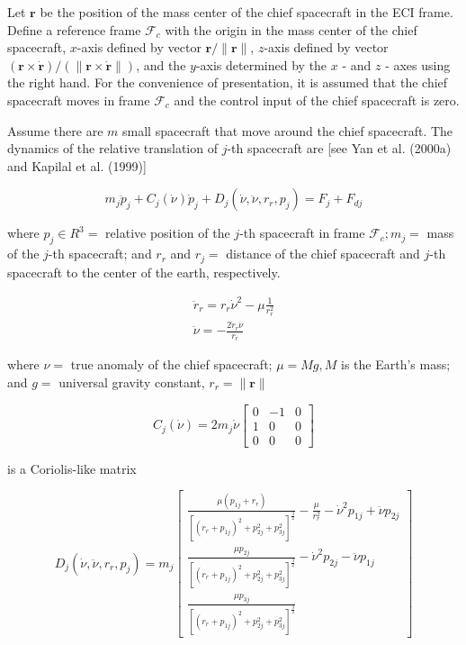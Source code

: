 \documentclass[10pt]{article}
\begin{document}
Let $\mathbf{r}$ be the position of the mass center of the chief spacecraft in the ECI frame. Define a reference frame $\mathcal{F}_{c}$ with the origin in the mass center of the chief spacecraft, $x$-axis defined by vector $\mathbf{r} /\|\mathbf{r}\|$, $z$-axis defined by vector $(\mathbf{r} \times \dot{\mathbf{r}}) /(\|\mathbf{r} \times \dot{\mathbf{r}}\|)$, and the $y$-axis determined by the $x$ - and $z$ - axes using the right hand. For the convenience of presentation, it is assumed that the chief spacecraft moves in frame $\mathcal{F}_{c}$ and the control input of the chief spacecraft is zero.

Assume there are $m$ small spacecraft that move around the chief spacecraft. The dynamics of the relative translation of $j$-th spacecraft are [see Yan et al. (2000a) and Kapilal et al. (1999)]

$$
m_{j} \ddot{p}_{j}+C_{j}(\dot{\nu}) \dot{p}_{j}+D_{j}\left(\dot{\nu}, \ddot{\nu}, r_{r}, p_{j}\right)=F_{j}+F_{d j}
$$

where $p_{j} \in R^{3}=$ relative position of the $j$-th spacecraft in frame $\mathcal{F}_{c} ; m_{j}=$ mass of the $j$-th spacecraft; and $r_{r}$ and $r_{j}=$ distance of the chief spacecraft and $j$-th spacecraft to the center of the earth, respectively.

$$
\begin{gathered}
\ddot{r}_{r}=r_{r} \dot{\nu}^{2}-\mu \frac{1}{r_{r}^{2}} \\
\ddot{\nu}=-\frac{2 \dot{r}_{r} \dot{\nu}}{r_{r}}
\end{gathered}
$$

where $\nu=$ true anomaly of the chief spacecraft; $\mu=M g, M$ is the Earth's mass; and $g=$ universal gravity constant, $r_{r}=\|\mathbf{r}\|$

$$
C_{j}(\dot{\nu})=2 m_{j} \dot{\nu}\left[\begin{array}{ccc}
0 & -1 & 0 \\
1 & 0 & 0 \\
0 & 0 & 0
\end{array}\right]
$$

is a Coriolis-like matrix

$$
D_{j}\left(\dot{\nu}, \ddot{\nu}, r_{r}, p_{j}\right)=m_{j}\left[\begin{array}{c}
\frac{\mu\left(p_{1 j}+r_{r}\right)}{\left[\left(r_{r}+p_{1 j}\right)^{2}+p_{2 j}^{2}+p_{3 j}^{2}\right]^{\frac{3}{2}}}-\frac{\mu}{r_{r}^{2}}-\dot{\nu}^{2} p_{1 j}+\ddot{\nu} p_{2 j} \\
\frac{\mu p_{2 j}}{\left[\left(r_{r}+p_{1 j}\right)^{2}+p_{2 j}^{2}+p_{3 j}^{2}\right]^{\frac{3}{2}}}-\dot{\nu}^{2} p_{2 j}-\ddot{\nu} p_{1 j} \\
\frac{\mu p_{3 j}}{\left[\left(r_{r}+p_{1 j}\right)^{2}+p_{2 j}^{2}+p_{3 j}^{2}\right]^{\frac{3}{2}}}
\end{array}\right]
$$
\end{document}
